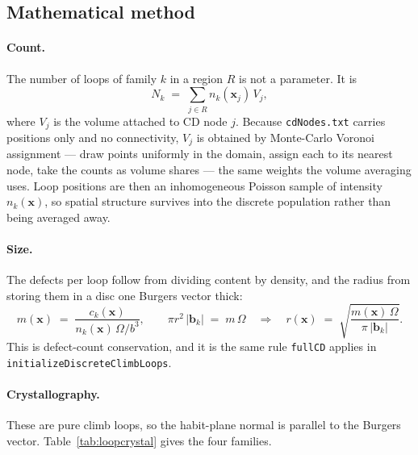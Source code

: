 \documentclass[11pt,a4paper]{article}
\newcommand{\code}[1]{\texttt{\small #1}}
\begin{document}
\subsection{Mathematical method}

\paragraph{Count.} The number of loops of family $k$ in a region $R$ is not a
parameter. It is
\begin{equation}
  N_k \;=\; \sum_{j \in R} n_k(\mathbf{x}_j)\, V_j ,
  \label{eq:loopcount}
\end{equation}
where $V_j$ is the volume attached to CD node $j$. Because \code{cdNodes.txt}
carries positions only and no connectivity, $V_j$ is obtained by Monte-Carlo
Voronoi assignment --- draw points uniformly in the domain, assign each to its
nearest node, take the counts as volume shares --- the same weights the volume
averaging uses. Loop positions are then an inhomogeneous Poisson sample of
intensity $n_k(\mathbf{x})$, so spatial structure survives into the discrete
population rather than being averaged away.

\paragraph{Size.} The defects per loop follow from dividing content by density,
and the radius from storing them in a disc one Burgers vector thick:
\begin{equation}
  m(\mathbf{x}) \;=\; \frac{c_k(\mathbf{x})}{n_k(\mathbf{x})\,\Omega/b^{3}} ,
  \qquad
  \pi r^{2}\,|\mathbf{b}_k| \;=\; m\,\Omega
  \quad\Longrightarrow\quad
  r(\mathbf{x}) \;=\; \sqrt{\frac{m(\mathbf{x})\,\Omega}{\pi\,|\mathbf{b}_k|}} .
  \label{eq:loopradius}
\end{equation}
This is defect-count conservation, and it is the same rule \code{fullCD} applies
in \code{initializeDiscreteClimbLoops}.

\paragraph{Crystallography.} These are pure climb loops, so the habit-plane
normal is parallel to the Burgers vector. Table~\ref{tab:loopcrystal} gives the
four families.
\end{document}
